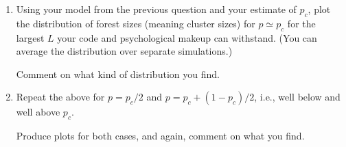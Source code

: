 \begin{enumerate}
  \begin{enumerate}
  \item 
    Using your model from the previous question and your
    estimate of $p_c$, plot the distribution of forest sizes
    (meaning cluster sizes)
    for $p \simeq p_c$ for the largest $L$ your code
    and psychological makeup can withstand.
    (You can average the distribution over separate simulations.)

    Comment on what kind of distribution you find.

  \item
    Repeat the above for $p=p_c/2$ and $p=p_c + (1-p_c)/2$,
    i.e., well below and well above $p_c$.

    Produce plots for both cases,
    and again, comment on what you find.
  \end{enumerate}

  
   \solutionstart


   \solutionend




\end{enumerate}
